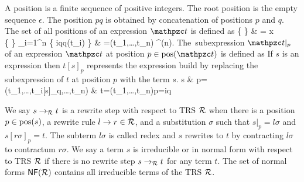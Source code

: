 \begin{definition}\label{def:position}
	A {\myem position} is a finite sequence of positive integers.
	The root position is the empty sequence $\epsilon$.
	The position $pq$ is obtained by concatenation of positions $p$ and $q$.
	The set of all positions of an expression $\mct$ is defined as 
	\DEFINE{ 
		\pos(\mct) }
	{
		\{ \epsilon \} 		
		& \mct = x \in \mcV \\
%		
		\{ \epsilon \} \cup \bigcup_{i=1}^{n} \{ iq\mid q\in\pos(t_i) \}	
		& \mct=\mcf(t_1,\ldots,t_n) \mcf\in\mcF^{(n)}.
	}
The~{\myem subexpression} $\mct|_p$ of an expression $\mct$ {\myem at position} $p\in\pos(\mct)$ is defined as
%
%
If $s$ is an expression then $t[s]_p$ represents the expression build by replacing the subexpression of $t$ at position $p$ with the term $s$.
{
	s 		& p=\epsilon \\
	\mf(t_1,\ldots,t_i[s]_q,\ldots,t_n)	& t=\mf(t_1,\ldots,t_n)p=iq
}
\end{definition}

\begin{definition}
	We say $s\rightarrow_{\mathcal R} t$ is a 
	{\myem rewrite step} 
	 with respect to TRS ${\mathcal R}$ 
	when there is a position $p \in \operatorname{pos}(s)$, 
	a rewrite rule $l\rightarrow r\in{\mathcal R}$, 
	and a substitution $\sigma$ such that
	$s|_p=l\sigma$ and $s[r\sigma]_p = t$.
		The subterm $l\sigma$ is called {\myem redex} and
	$s$ rewrites to $t$ by {\myem contracting} $l\sigma$ to {\myem contractum} $r\sigma$.
	We say a term $s$ is {\myem irreducible} or in {\myem normal form} with respect to TRS ${\mathcal R}$ if there is no rewrite step $s\rightarrow_{\mathcal R} t$ for any term $t$. 
	The set of normal forms $\mathsf{NF}({\mathcal R})$ contains all irreducible terms of the TRS ${\mathcal R}$.
	\end{definition}


